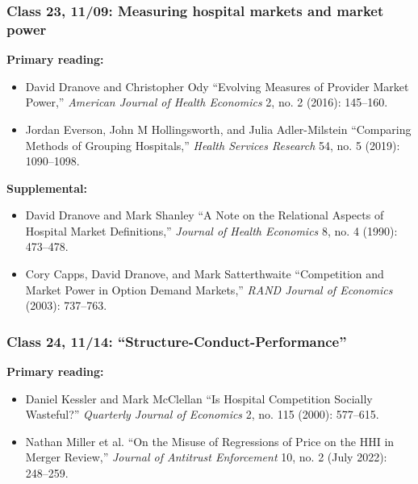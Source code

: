 \documentclass[11pt,]{article}
\providecommand{\tightlist}{%
  \setlength{\itemsep}{0pt}\setlength{\parskip}{0pt}}
\begin{document}
\hypertarget{class-23-1109-measuring-hospital-markets-and-market-power}{%
\subsubsection{Class 23, 11/09: Measuring hospital markets and market
power}\label{class-23-1109-measuring-hospital-markets-and-market-power}}

\textbf{Primary reading:}

\begin{itemize}
\tightlist
\item
  David Dranove and Christopher Ody {``Evolving {Measures} of {Provider}
  {Market} {Power},''} \emph{American Journal of Health Economics} 2,
  no. 2 (2016): 145--160.
\item
  Jordan Everson, John M Hollingsworth, and Julia Adler-Milstein
  {``Comparing Methods of Grouping Hospitals,''} \emph{Health Services
  Research} 54, no. 5 (2019): 1090--1098.
\end{itemize}

\textbf{Supplemental:}

\begin{itemize}
\tightlist
\item
  David Dranove and Mark Shanley {``A Note on the Relational Aspects of
  Hospital Market Definitions,''} \emph{Journal of Health Economics} 8,
  no. 4 (1990): 473--478.
\item
  Cory Capps, David Dranove, and Mark Satterthwaite {``Competition and
  Market Power in Option Demand Markets,''} \emph{RAND Journal of
  Economics} (2003): 737--763.
\end{itemize}

\hypertarget{class-24-1114-structure-conduct-performance}{%
\subsubsection{Class 24, 11/14:
``Structure-Conduct-Performance''}\label{class-24-1114-structure-conduct-performance}}

\textbf{Primary reading:}

\begin{itemize}
\tightlist
\item
  Daniel Kessler and Mark McClellan {``Is Hospital Competition Socially
  Wasteful?''} \emph{Quarterly Journal of Economics} 2, no. 115 (2000):
  577--615.
\item
  Nathan Miller et al. {``On the Misuse of Regressions of Price on the
  {HHI} in Merger Review,''} \emph{Journal of Antitrust Enforcement} 10,
  no. 2 (July 2022): 248--259.
\end{itemize}
\end{document}
